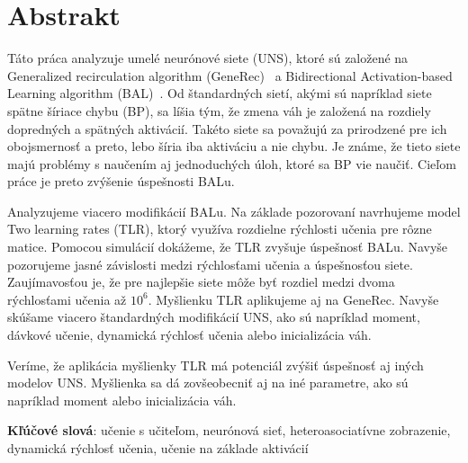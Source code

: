 
\section*{Abstrakt}
Táto práca analyzuje umelé neurónové siete (UNS), ktoré sú založené na Generalized recirculation algorithm (GeneRec)~\citep{o1996bio} a Bidirectional Activation-based Learning algorithm (BAL)~\citep{farkas2013bal}. Od štandardných sietí, akými sú napríklad siete spätne šíriace chybu (BP), sa líšia tým, že zmena váh je založená na rozdiely dopredných a spätných aktivácií. Takéto siete sa považujú za prirodzené pre ich obojsmernosť a preto, lebo šíria iba aktiváciu a nie chybu. Je známe, že tieto siete majú problémy s naučením aj jednoduchých úloh, ktoré sa BP vie naučiť. Cieľom práce je preto zvýšenie úspešnosti BALu. 

Analyzujeme viacero modifikácií BALu. Na základe pozorovaní navrhujeme model Two learning rates (TLR), ktorý využíva rozdielne rýchlosti učenia pre rôzne matice. Pomocou simulácií dokážeme, že TLR zvyšuje úspešnosť BALu. Navyše pozorujeme jasné závislosti medzi rýchlosťami učenia a úspešnosťou siete. Zaujímavosťou je, že pre najlepšie siete môže byť rozdiel medzi dvoma rýchlosťami učenia až $10^6$. Myšlienku TLR aplikujeme aj na GeneRec. Navyše skúšame viacero štandardných modifikácií UNS, ako sú napríklad moment, dávkové učenie, dynamická rýchlosť učenia alebo inicializácia váh. 

Veríme, že aplikácia myšlienky TLR má potenciál zvýšiť úspešnosť aj iných modelov UNS. Myšlienka sa dá zovšeobecniť aj na iné parametre, ako sú napríklad moment alebo inicializácia váh. 

\begin{flushleft}
  {\bf Kľúčové slová}: učenie s učiteľom, neurónová sieť, heteroasociatívne zobrazenie, dynamická rýchlosť učenia, učenie na základe aktivácií
\end{flushleft}

